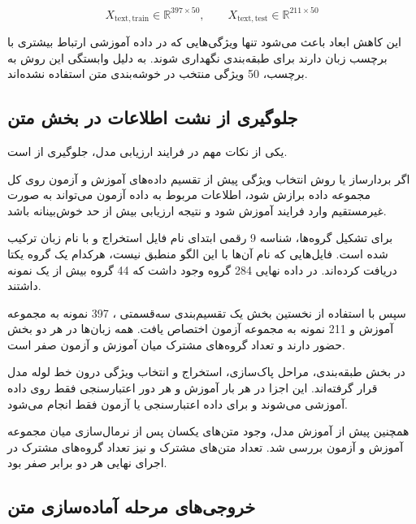 \documentclass[12pt,a4paper,oneside]{report}
\begin{document}
\begin{equation}
X_{\mathrm{text,train}}
\in
\mathbb{R}^{397\times50},
\qquad
X_{\mathrm{text,test}}
\in
\mathbb{R}^{211\times50}
\end{equation}

این کاهش ابعاد باعث می‌شود تنها ویژگی‌هایی که در داده آموزشی ارتباط بیشتری با برچسب زبان دارند برای طبقه‌بندی نگهداری شوند. به دلیل وابستگی این روش به برچسب، 50 ویژگی منتخب در خوشه‌بندی متن استفاده نشده‌اند.


\subsection{جلوگیری از نشت اطلاعات در بخش متن}

یکی از نکات مهم در فرایند ارزیابی مدل، جلوگیری از
است.

اگر بردارساز
یا روش انتخاب ویژگی پیش از تقسیم داده‌های آموزش و آزمون روی کل مجموعه داده برازش شود، اطلاعات مربوط به داده آزمون می‌تواند به صورت غیرمستقیم وارد فرایند آموزش شود و نتیجه ارزیابی بیش از حد خوش‌بینانه باشد.

برای تشکیل گروه‌ها، شناسه 9 رقمی ابتدای نام فایل استخراج و با نام زبان ترکیب شده است. فایل‌هایی که نام آن‌ها با این الگو منطبق نیست، هرکدام یک گروه یکتا دریافت کرده‌اند. در داده نهایی 284 گروه وجود داشت که 44 گروه بیش از یک نمونه داشتند.

سپس با استفاده از نخستین بخش یک تقسیم‌بندی سه‌قسمتی
،
397 نمونه به مجموعه آموزش و 211 نمونه به مجموعه آزمون اختصاص یافت. همه زبان‌ها در هر دو بخش حضور دارند و تعداد گروه‌های مشترک میان آموزش و آزمون صفر است.

در بخش طبقه‌بندی، مراحل پاک‌سازی، استخراج
و انتخاب ویژگی
درون خط لوله مدل قرار گرفته‌اند. این اجزا در هر بار آموزش و هر دور اعتبارسنجی فقط روی داده آموزشی
می‌شوند و برای داده اعتبارسنجی یا آزمون فقط
انجام می‌شود.

همچنین پیش از آموزش مدل، وجود متن‌های یکسان پس از نرمال‌سازی میان مجموعه آموزش و آزمون بررسی شد. تعداد متن‌های مشترک و نیز تعداد گروه‌های مشترک در اجرای نهایی هر دو برابر صفر بود.


\subsection{خروجی‌های مرحله آماده‌سازی متن}
\end{document}
